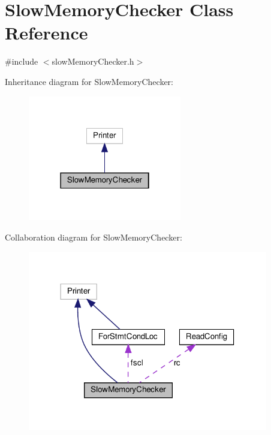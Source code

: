 \hypertarget{classSlowMemoryChecker}{}\section{Slow\+Memory\+Checker Class Reference}
\label{classSlowMemoryChecker}


{\ttfamily \#include $<$slow\+Memory\+Checker.\+h$>$}



Inheritance diagram for Slow\+Memory\+Checker\+:\nopagebreak
\begin{figure}[H]
\begin{center}
\leavevmode
\includegraphics[width=190pt]{classSlowMemoryChecker__inherit__graph}
\end{center}
\end{figure}


Collaboration diagram for Slow\+Memory\+Checker\+:\nopagebreak
\begin{figure}[H]
\begin{center}
\leavevmode
\includegraphics[width=297pt]{classSlowMemoryChecker__coll__graph}
\end{center}
\end{figure}
